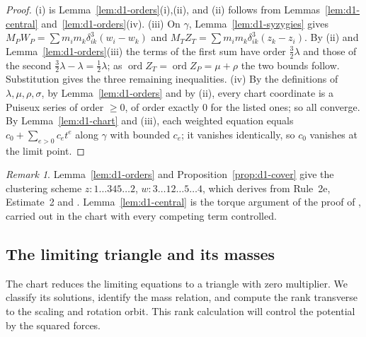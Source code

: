 \documentclass[Threeside,11pt]{article}
\theoremstyle{definition}
\theoremstyle{remark}
\newtheorem{remark}[theorem]{Remark}
\numberwithin{equation}{section}
\theoremstyle{remark}
\newcommand{\ord}{\operatorname{ord}}
\begin{document}
\begin{proof}
(i) is Lemma~\ref{lem:d1-orders}(i),(ii), and (ii) follows from Lemmas~\ref{lem:d1-central}
and~\ref{lem:d1-orders}(iv).  (iii) On $\gamma$, Lemma~\ref{lem:d1-syzygies} gives
$M_PW_P=\sum m_im_k\delta_{ik}^3(w_i-w_k)$ and $M_TZ_T=\sum m_im_k\delta_{ik}^3(z_k-z_i)$.  By (ii)
and Lemma~\ref{lem:d1-orders}(iii) the terms of the first sum have order $\frac32\lambda$ and
those of the second $\frac32\lambda-\lambda=\frac12\lambda$; as $\ord Z_T=\ord Z_P=\mu+\rho$ the
two bounds follow.  {Substitution gives the three remaining inequalities.}
(iv) By the definitions of $\lambda,\mu,\rho,\sigma$, by Lemma~\ref{lem:d1-orders} and by (ii),
every chart coordinate is a Puiseux series of order $\ge0$, of order exactly $0$ for the listed
ones; so all converge.  By Lemma~\ref{lem:d1-chart} and (iii), each weighted equation equals
$c_0+\sum_{e>0}c_et^e$ along $\gamma$ with bounded $c_e$; it vanishes identically, so $c_0$
vanishes at the limit point.
\end{proof}

\begin{remark}\label{rem:d1-ak}
{Lemma~\ref{lem:d1-orders}} and Proposition~\ref{prop:d1-cover} give the clustering scheme
$z:1\ldots345\ldots2$, $w:3\ldots12\ldots5\ldots4$, which
\cite[\S8.1, p.~572]{AK} derives from Rule~2e, Estimate~2 and \cite[Prop.~4]{AK}.
Lemma~\ref{lem:d1-central} is the torque argument of the proof of \cite[Prop.~4]{AK}, carried out
in the chart with every competing term controlled.
\end{remark}

\subsection{The limiting triangle and its masses}

The chart reduces the limiting equations to a triangle with zero multiplier.  We classify
its solutions, identify the mass relation, and compute the rank transverse to the scaling
and rotation orbit.  This rank calculation will control the potential by the squared forces.
\end{document}

